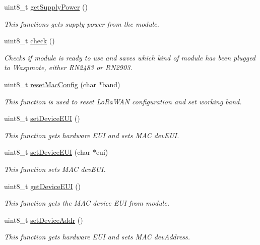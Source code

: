 \begin{DoxyCompactItemize}
uint8\+\_\+t \hyperlink{class_wasp_lo_ra_w_a_n_a488a55369702ffe38bfc5cd19ae4add2}{get\+Supply\+Power} ()
\begin{DoxyCompactList}\small\item\em This functions gets supply power from the module. \end{DoxyCompactList}\item 
uint8\+\_\+t \hyperlink{class_wasp_lo_ra_w_a_n_afdac73ef011d33f83d79db4210d55817}{check} ()
\begin{DoxyCompactList}\small\item\em Checks if module is ready to use and saves which kind of module has been plugged to Waspmote, either R\+N2483 or R\+N2903. \end{DoxyCompactList}\item 
uint8\+\_\+t \hyperlink{class_wasp_lo_ra_w_a_n_a1d24183427ec43e5e342252358d554ce}{reset\+Mac\+Config} (char $\ast$band)
\begin{DoxyCompactList}\small\item\em This function is used to reset Lo\+Ra\+W\+AN configuration and set working band. \end{DoxyCompactList}\item 
uint8\+\_\+t \hyperlink{class_wasp_lo_ra_w_a_n_ad4fe27fdc474674ea0a3f00afb82212b}{set\+Device\+E\+UI} ()
\begin{DoxyCompactList}\small\item\em This function gets hardware E\+UI and sets M\+AC dev\+E\+UI. \end{DoxyCompactList}\item 
uint8\+\_\+t \hyperlink{class_wasp_lo_ra_w_a_n_ad56e46484106fecc6fd09ed4aac212a6}{set\+Device\+E\+UI} (char $\ast$eui)
\begin{DoxyCompactList}\small\item\em This function sets M\+AC dev\+E\+UI. \end{DoxyCompactList}\item 
uint8\+\_\+t \hyperlink{class_wasp_lo_ra_w_a_n_a0e97dfe736a997be52cb8d1b4ee3e0c9}{get\+Device\+E\+UI} ()
\begin{DoxyCompactList}\small\item\em This function gets the M\+AC device E\+UI from module. \end{DoxyCompactList}\item 
uint8\+\_\+t \hyperlink{class_wasp_lo_ra_w_a_n_ab067b666eb32caedbf6a6ae84ed117f0}{set\+Device\+Addr} ()
\begin{DoxyCompactList}\small\item\em This function gets hardware E\+UI and sets M\+AC dev\+Address. \end{DoxyCompactList}\item 

\end{DoxyCompactItemize}

